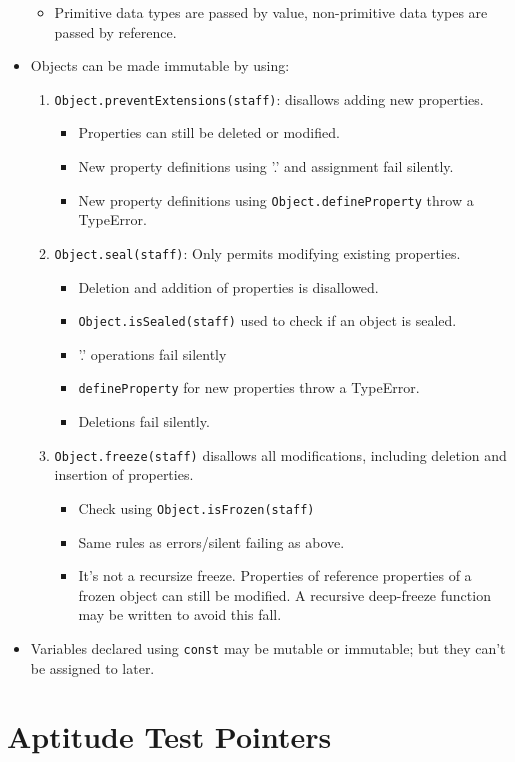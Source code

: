 \documentclass{report}
\begin{document}
\begin{itemize}
\begin{itemize}
\item Primitive data types are passed by value, non-primitive data types are passed by reference.
\end{itemize}
\item Objects can be made immutable by using:
\begin{enumerate}
\item \texttt{Object.preventExtensions(staff)}: disallows adding new properties. 
\begin{itemize}
    \item Properties can still be deleted or modified.
    \item New property definitions using '.' and assignment fail silently.
    \item New property definitions using \texttt{Object.defineProperty} throw a TypeError.
\end{itemize}
\item \texttt{Object.seal(staff)}: Only permits modifying existing properties. 
\begin{itemize}
\item Deletion and addition of properties is disallowed.
\item \texttt{Object.isSealed(staff)} used to check if an object is sealed.
\item '.' operations fail silently
\item \texttt{defineProperty} for new properties throw a TypeError.
\item Deletions fail silently.
\end{itemize}
\item \texttt{Object.freeze(staff)} disallows all modifications, including deletion and insertion of properties.
\begin{itemize}
\item Check using \texttt{Object.isFrozen(staff)}
\item Same rules as errors/silent failing as above.
\item It's not a recursize freeze. Properties of reference properties of a frozen object can still be modified. A recursive deep-freeze function may be written to avoid this fall.
\end{itemize}
\end{enumerate}
\item Variables declared using \texttt{const} may be mutable or immutable; but they can't be assigned to later.
\end{itemize}








\chapter{Aptitude Test Pointers}

\end{document}
